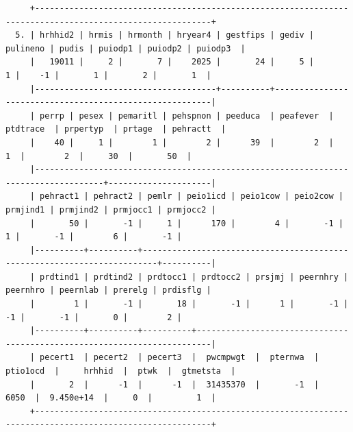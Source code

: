 \documentclass[
]{book}
\begin{document}
\begin{verbatim}
     +----------------------------------------------------------------------------------------------------------+
  5. | hrhhid2 | hrmis | hrmonth | hryear4 | gestfips | gediv | pulineno | pudis | puiodp1 | puiodp2 | puiodp3  |
     |   19011 |     2 |       7 |    2025 |       24 |     5 |        1 |    -1 |       1 |       2 |       1  |
     |-------------------------------------+----------+---------------------------------------------------------|
     | perrp | pesex | pemaritl | pehspnon | peeduca  | peafever  | ptdtrace  | prpertyp  | prtage  | pehractt  |
     |    40 |     1 |        1 |        2 |      39  |        2  |        1  |        2  |     30  |       50  |
     |------------------------------------------------------------------------------------+---------------------|
     | pehract1 | pehract2 | pemlr | peio1icd | peio1cow | peio2cow | prmjind1 | prmjind2 | prmjocc1 | prmjocc2 |
     |       50 |       -1 |     1 |      170 |        4 |       -1 |        1 |       -1 |        6 |       -1 |
     |----------+----------+-------------------------------------------------------------------------+----------|
     | prdtind1 | prdtind2 | prdtocc1 | prdtocc2 | prsjmj | peernhry | peernhro | peernlab | prerelg | prdisflg |
     |        1 |       -1 |       18 |       -1 |      1 |       -1 |       -1 |       -1 |       0 |        2 |
     |----------+----------+----------+-------------------------------------------------------------------------|
     | pecert1  | pecert2  | pecert3  |  pwcmpwgt  |  pternwa  |  ptio1ocd  |     hrhhid  |  ptwk  |  gtmetsta  |
     |       2  |      -1  |      -1  |  31435370  |       -1  |      6050  |  9.450e+14  |     0  |         1  |
     +----------------------------------------------------------------------------------------------------------+


\end{verbatim}
\end{document}
